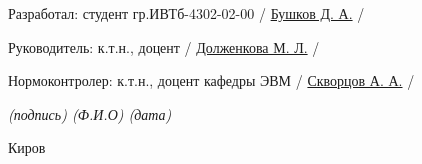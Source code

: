 \begin{titlepage}
	\newcommand{\ulinesize}{2.5cm}

	\large
	\vspace{1cm}
	\noindent
	Разработал: студент гр.ИВТб-4302-02-00 \hfill \uline{\hspace{\ulinesize}}
	/ \uline{Бушков Д. А.} / \hspace{8mm} \uline{\hspace{\ulinesize}}

	\vspace{1.5cm}
	\noindent
	Руководитель: к.т.н., доцент
	\hfill \uline{\hspace{\ulinesize}}
	/ \uline{Долженкова М. Л.} / \uline{\hspace{\ulinesize}}

	\vspace{1.5cm}
	\noindent
	Нормоконтролер: к.т.н., доцент кафедры ЭВМ
	\hfill \uline{\hspace{\ulinesize}}
	/ \uline{Скворцов А. А.} / \hspace{4mm} \uline{\hspace{\ulinesize}}

	{
		\small
		\itshape
		\hfill
		(подпись) \hspace{1.6cm} (Ф.И.О) \hspace{2.2cm} (дата) \hspace{0.8cm}
	}

	\begin{center}
		\vfill
		Киров \the\year
		\vspace{1cm}
	\end{center}


\end{titlepage}
